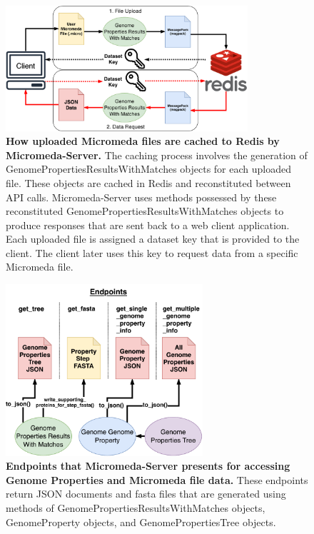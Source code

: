 \begin{figure}[!ht]
  \centering
	\includegraphics[width=0.80\textwidth]{media/Micromeda-Server-Workflow.pdf}
	 \caption[How uploaded Micromeda files are cached to Redis by 
Micromeda-Server.]{\textbf{How uploaded Micromeda files are cached to Redis by 
Micromeda-Server.} The caching process involves the generation of 
GenomePropertiesResultsWithMatches objects for each uploaded file. These objects 
are cached in Redis and reconstituted between API calls. Micromeda-Server uses 
methods possessed by these reconstituted GenomePropertiesResultsWithMatches 
objects to produce responses that are sent back to a web client application. 
Each uploaded file is assigned a dataset key that is provided to the client. The 
client later uses this key to request data from a specific Micromeda file.}
	 \label{fig:micromeda-server-workflow}
\end{figure}

\begin{figure}[!ht]
  \centering
	\includegraphics[width=0.65\textwidth]{media/Micromeda-Endpoints.pdf}
	 \caption[Endpoints that Micromeda-Server presents for accessing Genome 
Properties and Micromeda file data.]{\textbf{Endpoints that Micromeda-Server 
presents for accessing Genome Properties and Micromeda file data.} These 
endpoints return JSON documents and \gls{fasta} files that are generated using 
methods of GenomePropertiesResultsWithMatches objects, GenomeProperty objects, 
and GenomePropertiesTree objects.}
	 \label{fig:micromeda-endpoints}
\end{figure}

